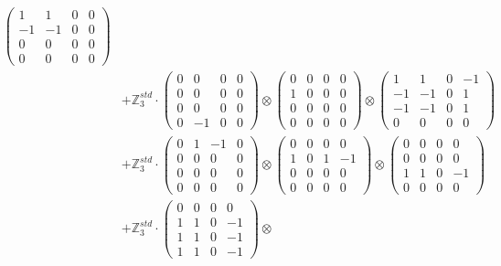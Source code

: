 \documentclass{article}
\begin{document}
{\begin{align}
            \begin{pmatrix} 1 & 1 & 0 & 0 \\ -1 & -1 & 0 & 0 \\ 0 & 0 & 0 & 0 \\ 0 & 0 & 0 & 0 \end{pmatrix} \\ 
        &+ \label{Rs16-Rc11-Solution-19-c25} \mathbb{Z}_3^{std} \cdot 
            \begin{pmatrix} 0 & 0 & 0 & 0 \\ 0 & 0 & 0 & 0 \\ 0 & 0 & 0 & 0 \\ 0 & -1 & 0 & 0 \end{pmatrix} \otimes 
            \begin{pmatrix} 0 & 0 & 0 & 0 \\ 1 & 0 & 0 & 0 \\ 0 & 0 & 0 & 0 \\ 0 & 0 & 0 & 0 \end{pmatrix} \otimes 
            \begin{pmatrix} 1 & 1 & 0 & -1 \\ -1 & -1 & 0 & 1 \\ -1 & -1 & 0 & 1 \\ 0 & 0 & 0 & 0 \end{pmatrix} \\ 
        &+ \label{Rs16-Rc11-Solution-19-c26} \mathbb{Z}_3^{std} \cdot 
            \begin{pmatrix} 0 & 1 & -1 & 0 \\ 0 & 0 & 0 & 0 \\ 0 & 0 & 0 & 0 \\ 0 & 0 & 0 & 0 \end{pmatrix} \otimes 
            \begin{pmatrix} 0 & 0 & 0 & 0 \\ 1 & 0 & 1 & -1 \\ 0 & 0 & 0 & 0 \\ 0 & 0 & 0 & 0 \end{pmatrix} \otimes 
            \begin{pmatrix} 0 & 0 & 0 & 0 \\ 0 & 0 & 0 & 0 \\ 1 & 1 & 0 & -1 \\ 0 & 0 & 0 & 0 \end{pmatrix} \\ 
        &+ \label{Rs16-Rc11-Solution-19-c27} \mathbb{Z}_3^{std} \cdot 
            \begin{pmatrix} 0 & 0 & 0 & 0 \\ 1 & 1 & 0 & -1 \\ 1 & 1 & 0 & -1 \\ 1 & 1 & 0 & -1 \end{pmatrix} \otimes 

\end{align}}
\end{document}
